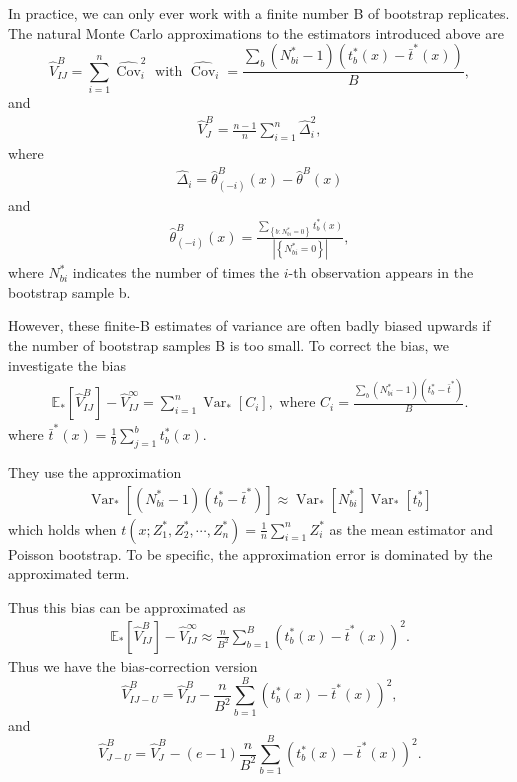 \documentclass[11pt]{article}
\begin{document}
In practice, we can only ever work with a finite number B of bootstrap replicates. The natural Monte Carlo approximations to the estimators introduced above are
\begin{equation}
\label{eq:VIJ-Monte}
\widehat{V}_{I J}^{B}=\sum_{i=1}^{n} \widehat{\operatorname{Cov}}_{i}^{2} \text { with } \widehat{\operatorname{Cov}}_{i}=\frac{\sum_{b}\left(N_{b i}^{*}-1\right)\left(t_{b}^{*}(x)-\bar{t}^{*}(x)\right)}{B},
\end{equation}
and
\begin{align*}
\widehat{V}_{J}^{B}=\frac{n-1}{n} \sum_{i=1}^{n} \hat{\Delta}_{i}^{2}, 
\end{align*}
where 
\begin{align*}
	\hat{\Delta}_{i}=\hat{\theta}_{(-i)}^{B}(x)-\hat{\theta}^{B}(x)
\end{align*}
and 
\begin{align*}	
\hat{\theta}_{(-i)}^{B}(x)=\frac{\sum_{\left\{b: N_{b i}^{*}=0\right\}} t_{b}^{*}(x)}{\left|\left\{N_{b i}^{*}=0\right\}\right|},
\end{align*}
where $N_{bi}^{*}$ indicates the number of times the $i$-th observation appears in the bootstrap sample b.

However, these finite-B estimates of variance are often badly biased upwards
if the number of bootstrap samples B is too small. 
To correct the bias, we investigate the bias \begin{align*}
	\mathbb{E}_{*}\left[\widehat{V}_{I J}^{B}\right]-\widehat{V}_{I J}^{\infty}=\sum_{i=1}^{n} \operatorname{Var}_{*}\left[C_{i}\right], \text { where } C_{i}=\frac{\sum_{b}\left(N_{b i}^{*}-1\right)\left(t_{b}^{*}-\bar{t}^{*}\right)}{B}.
\end{align*}
	where $\bar{t}^{*}(x) = \frac{1}{b}\sum_{j=1}^b t^{*}_b(x)$.

They use the approximation \begin{align*}
	\operatorname{Var}_{*}\left[\left(N_{b i}^{*}-1\right)\left(t_{b}^{*}-\bar{t}^{*}\right)\right] \approx \operatorname{Var}_{*}\left[N_{b i}^{*}\right] \operatorname{Var}_{*}\left[t_{b}^{*}\right]
\end{align*}
which holds when $t(x;Z_1^{*},Z_2^{*},\cdots,Z_n^{*})=\frac{1}{n}\sum_{i=1}^nZ_i^{*}$ as the mean estimator and Poisson bootstrap.
To be specific, the approximation error is dominated by the approximated term.

Thus this bias can be approximated as \begin{align*}
	\mathbb{E}_{*}\left[\widehat{V}_{I J}^{B}\right]-\widehat{V}_{I J}^{\infty}\approx \frac{n}{B^{2}} \sum_{b=1}^{B}\left(t_{b}^{*}(x)-\bar{t}^{*}(x)\right)^{2}.
\end{align*}
Thus we have the bias-correction version
\begin{equation}
	\label{eq:bias-correction-IJ}
\widehat{V}_{I J-U}^{B}=\widehat{V}_{I J}^{B}-\frac{n}{B^{2}} \sum_{b=1}^{B}\left(t_{b}^{*}(x)-\bar{t}^{*}(x)\right)^{2}, 
\end{equation}
and 
\begin{equation}
	\label{eq:bias-correction-J}
\widehat{V}_{J-U}^{B}=\widehat{V}_{J}^{B}-(e-1) \frac{n}{B^{2}} \sum_{b=1}^{B}\left(t_{b}^{*}(x)-\bar{t}^{*}(x)\right)^{2}.
\end{equation}
		
\end{document}
